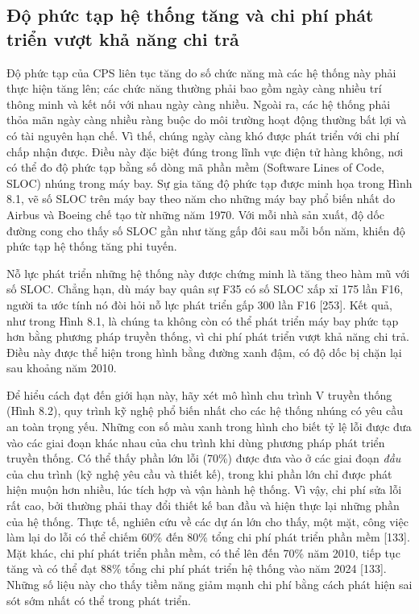\subsection{Độ phức tạp hệ thống tăng và chi phí phát triển vượt khả năng chi trả}
Độ phức tạp của CPS liên tục tăng do số chức năng mà các hệ thống này phải thực hiện tăng lên; các chức năng thường phải bao gồm ngày càng nhiều trí thông minh và kết nối với nhau ngày càng nhiều. Ngoài ra, các hệ thống phải thỏa mãn ngày càng nhiều ràng buộc do môi trường hoạt động thường bất lợi và có tài nguyên hạn chế. Vì thế, chúng ngày càng khó được phát triển với chi phí chấp nhận được. Điều này đặc biệt đúng trong lĩnh vực điện tử hàng không, nơi có thể đo độ phức tạp bằng số dòng mã phần mềm (Software Lines of Code, SLOC) nhúng trong máy bay. Sự gia tăng độ phức tạp được minh họa trong Hình 8.1, vẽ số SLOC trên máy bay theo năm cho những máy bay phổ biến nhất do Airbus và Boeing chế tạo từ những năm 1970. Với mỗi nhà sản xuất, độ dốc đường cong cho thấy số SLOC gần như tăng gấp đôi sau mỗi bốn năm, khiến độ phức tạp hệ thống tăng phi tuyến.

Nỗ lực phát triển những hệ thống này được chứng minh là tăng theo hàm mũ với số SLOC. Chẳng hạn, dù máy bay quân sự F35 có số SLOC xấp xỉ 175 lần F16, người ta ước tính nó đòi hỏi nỗ lực phát triển gấp 300 lần F16 [253]. Kết quả, như trong Hình 8.1, là chúng ta không còn có thể phát triển máy bay phức tạp hơn bằng phương pháp truyền thống, vì chi phí phát triển vượt khả năng chi trả. Điều này được thể hiện trong hình bằng đường xanh đậm, có độ dốc bị chặn lại sau khoảng năm 2010.

Để hiểu cách đạt đến giới hạn này, hãy xét mô hình chu trình V truyền thống (Hình 8.2), quy trình kỹ nghệ phổ biến nhất cho các hệ thống nhúng có yêu cầu an toàn trọng yếu. Những con số màu xanh trong hình cho biết tỷ lệ lỗi được đưa vào các giai đoạn khác nhau của chu trình khi dùng phương pháp phát triển truyền thống. Có thể thấy phần lớn lỗi (70\%) được đưa vào ở các giai đoạn \emph{đầu} của chu trình (kỹ nghệ yêu cầu và thiết kế), trong khi phần lớn chỉ được phát hiện muộn hơn nhiều, lúc tích hợp và vận hành hệ thống. Vì vậy, chi phí sửa lỗi rất cao, bởi thường phải thay đổi thiết kế ban đầu và hiện thực lại những phần của hệ thống. Thực tế, nghiên cứu về các dự án lớn cho thấy, một mặt, công việc làm lại do lỗi có thể chiếm 60\% đến 80\% tổng chi phí phát triển phần mềm [133]. Mặt khác, chi phí phát triển phần mềm, có thể lên đến 70\% năm 2010, tiếp tục tăng và có thể đạt 88\% tổng chi phí phát triển hệ thống vào năm 2024 [133]. Những số liệu này cho thấy tiềm năng giảm mạnh chi phí bằng cách phát hiện sai sót sớm nhất có thể trong phát triển.

